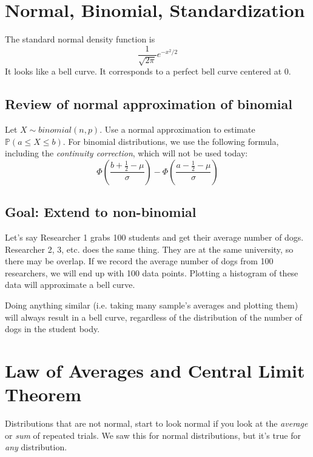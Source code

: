 \documentclass[titlepage, 12pt, leqno]{article}
\begin{document}
\pagebreak
\section{Normal, Binomial, Standardization}
The standard normal density function is
\[
    \frac{1}{\sqrt{2\pi }}e^{-x^2/2}
\]
It looks like a bell curve. It corresponds to a perfect bell curve centered at 0.

\subsection{Review of normal approximation of binomial}
Let $X \sim binomial(n,p)$. Use a normal approximation to estimate $\mathbb{P}(
a \le X \le b)$.
\vspace{10px}
For binomial distributions, we use the following formula, including the 
\textit{continuity correction}, which will not be used today:
\[
\Phi\left(\frac{b+\frac{1}{2}-\mu}{\sigma}\right) - 
\Phi\left(\frac{a-\frac{1}{2}-\mu}{\sigma}\right)
\]

\subsection{Goal: Extend to non-binomial}
Let's say Researcher 1 grabs 100 students and get their average number of dogs.
Researcher 2, 3, etc. does the same thing. They are at the same university, so
there may be overlap. If we record the average number of dogs from 100 
researchers, we will end up with 100 data points. Plotting a histogram of these
data will approximate a bell curve. 

Doing anything similar (i.e. taking many sample's averages and plotting them) will
always result in a bell curve, regardless of the distribution of the number of
dogs in the student body.

\pagebreak
\section{Law of Averages and Central Limit Theorem}
Distributions that are not normal, start to look normal if you look at the
\textit{average} or \textit{sum} of repeated trials. We saw this for normal
distributions, but it's true for \textit{any} distribution.
\end{document}
